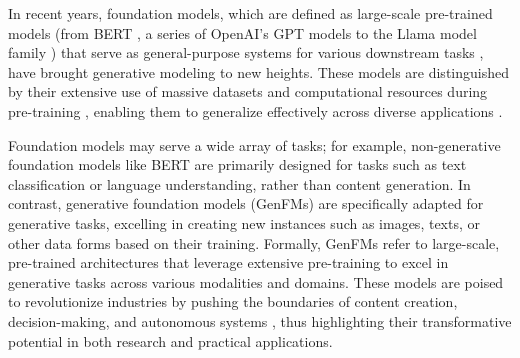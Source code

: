 In recent years, foundation models, which are defined as large-scale pre-trained models (from BERT \cite{bert, liu2019roberta, beltagy2019scibert}, a series of OpenAI's GPT models \cite{radford2018improving,ChatGPT,GPT-4} to the Llama model family \cite{llama,llama2,meta_llama32_2024}) that serve as general-purpose systems for various downstream tasks \cite{bommasani2021opportunities}, have brought generative modeling to new heights. These models are distinguished by their extensive use of massive datasets \cite{liu2024datasets} and computational resources during pre-training \cite{hu2021lora}, enabling them to generalize effectively across diverse applications \cite{subramanian2024towards, yuan2021florence, liang2024foundation, gao2024survey, moor2023foundation, li2024political}.


 Foundation models may serve a wide array of tasks; for example, non-generative foundation models like BERT \cite{bert} are primarily designed for tasks such as text classification or language understanding, rather than content generation. In contrast, generative foundation models (GenFMs) \cite{evgenfm2024} are specifically adapted for generative tasks, excelling in creating new instances such as images, texts, or other data forms based on their training.
Formally, GenFMs refer to large-scale, pre-trained architectures that leverage extensive pre-training to excel in generative tasks across various modalities and domains. These models are poised to revolutionize industries by pushing the boundaries of content creation, decision-making, and autonomous systems \cite{agentbench, guo2024large}, thus highlighting their transformative potential in both research and practical applications. 



